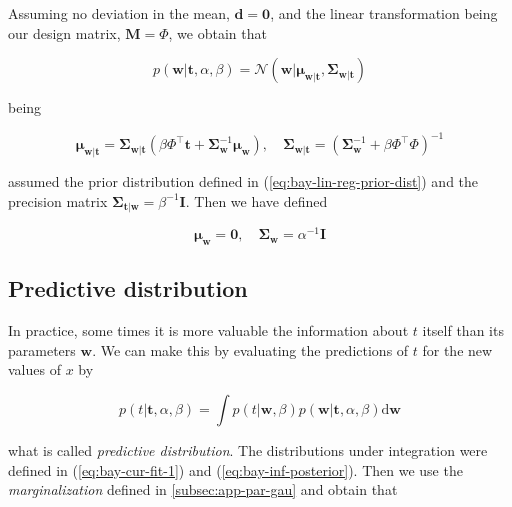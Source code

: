 \documentclass[11pt]{article} %
\begin{document}
 Assuming no deviation in the mean, $\mathbf{d} = \mathbf{0}$, and the linear transformation being our design matrix, $\mathbf{M} = \Phi$, we obtain that

 \begin{equation}
   \label{eq:bay-inf-posterior}
    p(\mathbf{w}|\mathbf{t},\alpha,\beta) = \mathcal{N} \left( \mathbf{w} | \boldsymbol{\mu}_{\mathbf{w}|\mathbf{t}} , \boldsymbol{\Sigma}_{\mathbf{w}|\mathbf{t}}\right)
 \end{equation}

 being

 \begin{equation}
   \boldsymbol{\mu}_{\mathbf{w}|\mathbf{t}}=\boldsymbol{\Sigma}_{\mathbf{w}|\mathbf{t}}\left(\beta \Phi^\top \mathbf{t}+\boldsymbol{\Sigma}_{\mathbf{w}}^{-1} \boldsymbol{\mu}_{\mathbf{w}}\right), \quad \boldsymbol{\Sigma}_{\mathbf{w}|\mathbf{t}}=\left(\boldsymbol{\Sigma}_{\mathbf{w}}^{-1}+ \beta \Phi^\top \Phi\right)^{-1}
 \end{equation}

 assumed the prior distribution defined in (\ref{eq:bay-lin-reg-prior-dist}) and the precision matrix $\boldsymbol{\Sigma}_{\mathbf{t}|\mathbf{w}} = \beta^{-1}\mathbf{I}$. Then we have defined

 \begin{equation}
    \boldsymbol{\mu}_\mathbf{w}=\mathbf{0}, \quad \boldsymbol{\Sigma}_\mathbf{w} = \alpha^{-1} \mathbf{I}
 \end{equation}

\subsection{Predictive distribution}

In practice, some times it is more valuable the information about $t$ itself than its parameters $\mathbf{w}$. We can make this by evaluating the predictions of $t$ for the new values of $x$ by

\begin{equation}
   p(t | \mathbf{t}, \alpha, \beta)=\int p(t | \mathbf{w}, \beta) p(\mathbf{w} | \mathbf{t}, \alpha, \beta) \mathrm{d} \mathbf{w}
\end{equation}

what is called \textit{predictive distribution}. The distributions under integration were defined in (\ref{eq:bay-cur-fit-1}) and (\ref{eq:bay-inf-posterior}). Then we use the \textit{marginalization} defined in \autoref{subsec:app-par-gau} and obtain that
\end{document}
